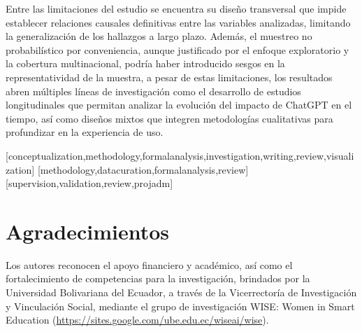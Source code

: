 \documentclass[spanish]{textolivre}
\begin{document}
Entre las limitaciones del estudio se encuentra su diseño transversal que impide establecer relaciones causales definitivas entre las variables analizadas, limitando la generalización de los hallazgos a largo plazo. Además, el muestreo no probabilístico por conveniencia, aunque justificado por el enfoque exploratorio y la cobertura multinacional, podría haber introducido sesgos en la representatividad de la muestra, a pesar de estas limitaciones, los resultados abren múltiples líneas de investigación como el desarrollo de estudios longitudinales que permitan analizar la evolución del impacto de ChatGPT en el tiempo, así como diseños mixtos que integren metodologías cualitativas para profundizar en la experiencia de uso. 



\printbibliography\label{sec-bib}


\begin{contributors}
[conceptualization,methodology,formalanalysis,investigation,writing,review,visualization]
[methodology,datacuration,formalanalysis,review]
[supervision,validation,review,projadm]
\end{contributors}

\section*{Agradecimientos}
Los autores reconocen el apoyo financiero y académico, así como el fortalecimiento de competencias para la investigación, brindados por la Universidad Bolivariana del Ecuador, a través de la Vicerrectoría de Investigación y Vinculación Social, mediante el grupo de investigación WISE: Women in Smart Education (\url{https://sites.google.com/ube.edu.ec/wiseai/wise}).

\begin{dataavailability}
\end{dataavailability}
\end{document}
